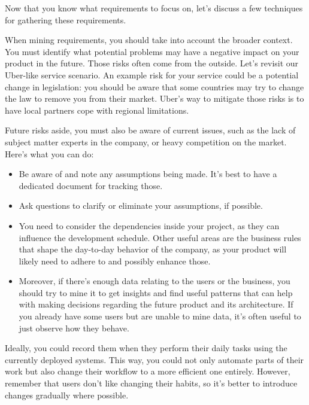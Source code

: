 
Now that you know what requirements to focus on, let's discuss a few techniques for gathering these requirements.



When mining requirements, you should take into account the broader context. You must identify what potential problems may have a negative impact on your product in the future. Those risks often come from the outside. Let's revisit our Uber-like service scenario. An example risk for your service could be a potential change in legislation: you should be aware that some countries may try to change the law to remove you from their market. Uber's way to mitigate those risks is to have local partners cope with regional limitations.

Future risks aside, you must also be aware of current issues, such as the lack of subject matter experts in the company, or heavy competition on the market. Here's what you can do:


\begin{itemize}
\item 
Be aware of and note any assumptions being made. It's best to have a dedicated document for tracking those.

\item 
Ask questions to clarify or eliminate your assumptions, if possible.

\item 
You need to consider the dependencies inside your project, as they can influence the development schedule. Other useful areas are the business rules that shape the day-to-day behavior of the company, as your product will likely need to adhere to and possibly enhance those.

\item 
Moreover, if there's enough data relating to the users or the business, you should try to mine it to get insights and find useful patterns that can help with making decisions regarding the future product and its architecture. If you already have some users but are unable to mine data, it's often useful to just observe how they behave.
\end{itemize}

Ideally, you could record them when they perform their daily tasks using the currently deployed systems. This way, you could not only automate parts of their work but also change their workflow to a more efficient one entirely. However, remember that users don't like changing their habits, so it's better to introduce changes gradually where possible.


